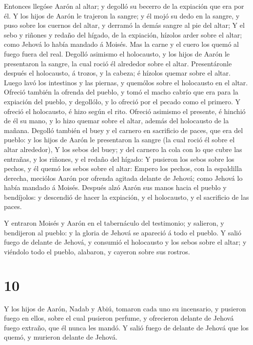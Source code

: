  Entonces llegóse Aarón al altar; y degolló su becerro de la
expiación que era por él.  Y los hijos de Aarón le trajeron
la sangre; y él mojó su dedo en la sangre, y puso sobre los cuernos del
altar, y derramó la demás sangre al pie del altar;  Y el
sebo y riñones y redaño del hígado, de la expiación, hízolos arder sobre
el altar; como Jehová lo había mandado á Moisés.  Mas la
carne y el cuero los quemó al fuego fuera del real. 
Degolló asimismo el holocausto, y los hijos de Aarón le presentaron la
sangre, la cual roció él alrededor sobre el altar. 
Presentáronle después el holocausto, á trozos, y la cabeza; é hízolos
quemar sobre el altar.  Luego lavó los intestinos y las
piernas, y quemólos sobre el holocausto en el altar. 
Ofreció también la ofrenda del pueblo, y tomó el macho cabrío que era
para la expiación del pueblo, y degollólo, y lo ofreció por el pecado
como el primero.  Y ofreció el holocausto, é hizo según el
rito.  Ofreció asimismo el presente, é hinchió de él su
mano, y lo hizo quemar sobre el altar, además del holocausto de la
mañana.  Degolló también el buey y el carnero en sacrificio
de paces, que era del pueblo: y los hijos de Aarón le presentaron la
sangre (la cual roció él sobre el altar alrededor),  Y los
sebos del buey; y del carnero la cola con lo que cubre las entrañas, y
los riñones, y el redaño del hígado:  Y pusieron los sebos
sobre los pechos, y él quemó los sebos sobre el altar: 
Empero los pechos, con la espaldilla derecha, meciólos Aarón por ofrenda
agitada delante de Jehová; como Jehová lo había mandado á Moisés.
 Después alzó Aarón sus manos hacia el pueblo y bendíjolos:
y descendió de hacer la expiación, y el holocausto, y el sacrificio de
las paces.

 Y entraron Moisés y Aarón en el tabernáculo del
testimonio; y salieron, y bendijeron al pueblo: y la gloria de Jehová se
apareció á todo el pueblo.  Y salió fuego de delante de
Jehová, y consumió el holocausto y los sebos sobre el altar; y viéndolo
todo el pueblo, alabaron, y cayeron sobre sus rostros.

\hypertarget{section-9}{%
\section{10}\label{section-9}}

 Y los hijos de Aarón, Nadab y Abiú, tomaron cada uno su
incensario, y pusieron fuego en ellos, sobre el cual pusieron perfume, y
ofrecieron delante de Jehová fuego extraño, que él nunca les mandó.
 Y salió fuego de delante de Jehová que los quemó, y
murieron delante de Jehová.

